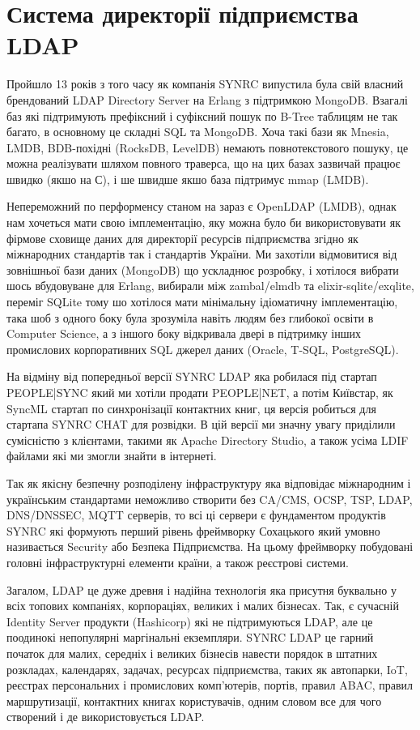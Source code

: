 \newpage
\section{Система директорії підприємства LDAP}

Пройшло 13 років з того часу як компанія SYNRC випустила була свій власний брендований LDAP Directory Server на Erlang з підтримкою MongoDB. Взагалі баз які підтримують префіксний і суфіксний пошук по B-Tree таблицям не так багато, в основному це складні SQL та MongoDB. Хоча такі бази як Mnesia, LMDB, BDB-похідні (RocksDB, LevelDB) немають повнотекстового пошуку, це можна реалізувати шляхом повного траверса, що на цих базах зазвичай працює швидко (якшо на С), і ше швидше якшо база підтримує mmap (LMDB).

Непереможний по перформенсу станом на зараз є OpenLDAP (LMDB), однак нам хочеться мати свою імплементацію, яку можна було би використовувати як фірмове сховище даних для директорії ресурсів підприємства згідно як міжнародних стандартів так і стандартів України. Ми захотіли відмовитися від зовнішньої бази даних (MongoDB) що ускладнює розробку, і хотілося вибрати шось вбудовуване для Erlang, вибирали між zambal/elmdb та elixir-sqlite/exqlite, переміг SQLite тому шо хотілося мати мінімальну ідіоматичну імплементацію, така шоб з одного боку була зрозуміла навіть людям без глибокої освіти в Computer Science, а з іншого боку відкривала двері в підтримку інших промислових корпоративних SQL джерел даних (Oracle, T-SQL, PostgreSQL).

На відміну від попередньої версії SYNRC LDAP яка робилася під стартап PEOPLE|SYNC який ми хотіли продати PEOPLE|NET, а потім Київстар, як SyncML стартап по синхронізації контактних книг, ця версія робиться для стартапа SYNRC CHAT для розвідки. В цій версії ми значну увагу приділили сумісністю з клієнтами, такими як Apache Directory Studio, а також усіма LDIF файлами які ми змогли знайти в інтернеті.

Так як якісну безпечну розподілену інфраструктуру яка відповідає міжнародним і українським стандартами неможливо створити без CA/CMS, OCSP, TSP, LDAP, DNS/DNSSEC, MQTT серверів, то всі ці сервери є фундаментом продуктів SYNRC які формують перший рівень фреймворку Сохацького який умовно називається Security або Безпека Підприємства. На цьому фреймворку побудовані головні інфраструктурні елементи країни, а також реєстрові системи.

Загалом, LDAP це дуже древня і надійна технологія яка присутня буквально у всіх топових компаніях, корпораціях, великих і малих бізнесах. Так, є сучасній Identity Server продукти (Hashicorp) які не підтримуються LDAP, але це поодинокі непопулярні маргінальні екземпляри. SYNRC LDAP це гарний початок для малих, середніх і великих бізнесів навести порядок в штатних розкладах, календарях, задачах, ресурсах підприємства, таких як автопарки, IoT, реєстрах персональних і промислових комп'ютерів, портів, правил ABAC, правил маршрутизації, контактних книгах користувачів, одним словом все для чого створений і де використовується LDAP.

